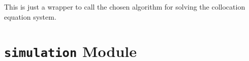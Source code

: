 \documentclass[letterpaper,10pt,english]{sphinxmanual}
\begin{document}
\begin{fulllineitems}
\begin{fulllineitems}
\end{fulllineitems}


\begin{fulllineitems}
\label{pytrajectory:pytrajectory.solver.Solver.newton}
\end{fulllineitems}


\begin{fulllineitems}
\label{pytrajectory:pytrajectory.solver.Solver.solve}
This is just a wrapper to call the chosen algorithm for solving the
collocation equation system.

\end{fulllineitems}


\end{fulllineitems}



\section{\texttt{simulation} Module}
\label{pytrajectory:module-pytrajectory.simulation}\label{pytrajectory:simulation-module}
\end{document}
